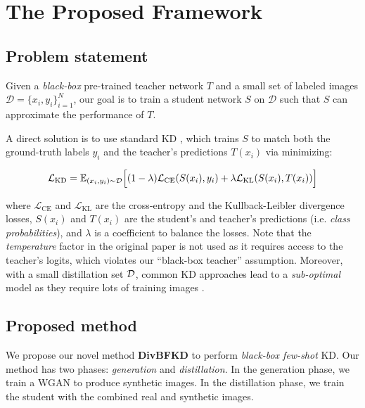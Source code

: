 \section{The Proposed Framework} \label{sec:33-research01-framework}

\subsection{Problem statement}
\begin{foldable}
    Given a \textit{black-box} pre-trained teacher network $T$ and a small set of labeled images $\mathcal{D}=\{x_{i},y_{i}\}_{i=1}^{N}$, our goal is to train a student network $S$ on $\mathcal{D}$ such that $S$ can approximate the performance of $T$.
\end{foldable}

\begin{foldable}
    A direct solution is to use standard KD \cite{hinton2015distilling}, which trains $S$ to match both the ground-truth labels $y_{i}$ and the teacher's predictions $T(x_{i})$ via minimizing:
\end{foldable}
\begin{equation}
    \mathcal{L}_{\text{KD}}=\mathbb{E}_{(x_{i},y_{i})\sim{\cal D}}\Bigl[(1-\lambda)\mathcal{L}_{\text{CE}}(S(x_{i}),y_{i})+\lambda\mathcal{L}_{\text{KL}}(S(x_{i}),T(x_{i}))\Bigr]\label{ch3:eq:StandardKD}
\end{equation}
\begin{foldable}
    where $\mathcal{L}_{\text{CE}}$ and $\mathcal{L}_{\text{KL}}$ are the cross-entropy and the Kullback-Leibler divergence losses, $S(x_{i})$ and $T(x_{i})$ are the student\textquoteright s and teacher's predictions (i.e. \textit{class probabilities}), and $\lambda$ is a coefficient to balance the losses.
    Note that the \textit{temperature} factor in the original paper is not used as it requires access to the teacher's logits, which violates our ``black-box teacher'' assumption.
    Moreover, with a small distillation set ${\cal D}$, common KD approaches lead to a \textit{sub-optimal} model as they require lots of training images \cite{hinton2015distilling,kim2018paraphrasing,ahn2019variational,tian2020contrastive}.
\end{foldable}

\subsection{Proposed method\label{ch3:subsec:Proposed-method}}
\begin{foldable}
    We propose our novel method \textbf{DivBFKD} to perform \textit{black-box few-shot} KD.
    Our method has two phases: \textit{generation} and \textit{distillation}.
    In the generation phase, we train a WGAN to produce synthetic images.
    In the distillation phase, we train the student with the combined real and synthetic images.
\end{foldable}

